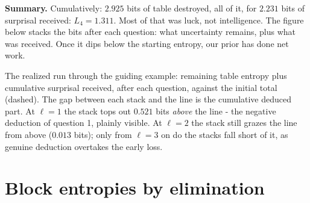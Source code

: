 \documentclass[11pt]{article}
\let\stdsection\section
\renewcommand{\section}{\clearpage\stdsection}
\begin{document}
\begin{example}[label=ex:run21]
\textbf{Summary.} Cumulatively: $2.925$ bits of table
destroyed, all of it, for $2.231$ bits of
surprisal received: $L_4 = 1.311$. Most of that was luck, not
intelligence. The figure below
stacks the bits after each question: what uncertainty remains, plus what was
received. Once it dips below the starting entropy, our prior has done net work. 

\begin{center}
\end{center}
The realized run through the guiding example:
remaining table entropy plus cumulative surprisal received, after
each question, against the initial total (dashed). The gap between
each stack and the line is the cumulative deduced part. At
$\ell = 1$ the stack tops out $0.521$ bits \emph{above} the
line - the negative deduction of question 1, plainly visible. At
$\ell = 2$ the stack still grazes the line from above ($0.013$ bits);
only from $\ell = 3$ on do the stacks fall short of it, as genuine
deduction overtakes the early loss.
\end{example}


\section{Block entropies by elimination}\label{app:tensor-marginals}
\end{document}
